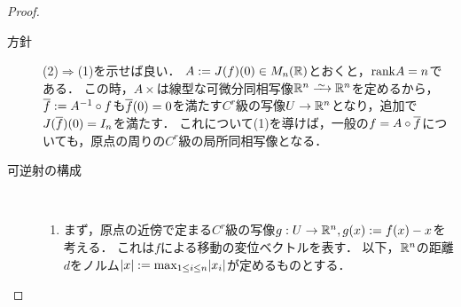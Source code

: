 \documentclass[uplatex,dvipdfmx]{jsreport}
\begin{document}
\begin{proof}\mbox{}
    \begin{description}
        \item[方針] 
        (2)$\Rightarrow$(1)を示せば良い．
        $A:=J(f)(0)\in M_n(\mathbb{R})$とおくと，$\mathrm{rank} A=n$である．
        この時，$A\times$は線型な可微分同相写像$\R^n\iso\R^n$を定めるから，$\overline{f}:=A^{-1}\circ f$も$\overline{f}(0)=0$を満たす$C^r$級の写像$U\to\mathbb{R}^n$となり，追加で$J(\overline{f})(0)=I_n$を満たす．
        これについて(1)を導けば，一般の$f=A\circ\overline{f}$についても，原点の周りの$C^r$級の局所同相写像となる．
        \item[可逆射の構成] \mbox{}\\
        \begin{enumerate}
            \item まず，原点の近傍で定まる$C^r$級の写像$g:U\to\mathbb{R}^n,g(x):=f(x)-x$を考える．
            これは$f$による移動の変位ベクトルを表す．
            以下，$\mathbb{R}^n$の距離$d$をノルム$\lvert x\rvert:=\max_{1\le i\le n}\lvert x_i\rvert$が定めるものとする．


\end{enumerate}
\end{description}
\end{proof}
\end{document}
